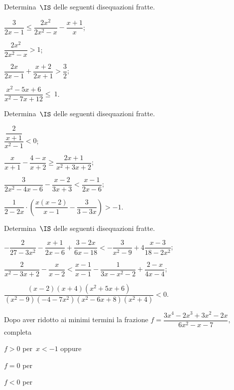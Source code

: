 \begin{esercizio}[\Ast]
\label{ese:21.62}
Determina~$\IS$ delle seguenti disequazioni fratte.
\begin{multicols}{2}
\begin{enumeratea}
\spazielenx
 \item $\dfrac{3}{2x-1}\le \dfrac{2x^{2}}{2x^{2}-x}-\dfrac{x+1}{x}$;
\item $\dfrac{2x^{2}}{2x^{2}-x}>1$;
\item $\dfrac{2x}{2x-1}+\dfrac{x+2}{2x+1}>\dfrac{3}{2}$;
\item $\dfrac{x^{2}-5x+6}{x^{2}-7x+12}\le~1$.
\end{enumeratea}
\end{multicols}
\end{esercizio}

\begin{esercizio}[\Ast]
\label{ese:21.63}
Determina~$\IS$ delle seguenti disequazioni fratte.
\begin{multicols}{2}
\begin{enumeratea}
\spazielenx
 \item $\dfrac{\dfrac{2}{x+1}}{x^{2}-1}<0$;
\item $\dfrac{x}{x+1}-\dfrac{4-x}{x+2}\ge \dfrac{2x+1}{x^{2}+3x+2}$;
\item $\dfrac{3}{2x^{2}-4x-6}-\dfrac{x-2}{3x+3}<\dfrac{x-1}{2x-6}$;
\item $\dfrac{1}{2-2x}\cdot \left(\dfrac{x(x-2)}{x-1}-\dfrac{3}{3-3x}\right)>-1$.
\end{enumeratea}
\end{multicols}
\end{esercizio}

\begin{esercizio}[\Ast]
\label{ese:21.64}
Determina~$\IS$ delle seguenti disequazioni fratte.

\begin{enumeratea}
 \item $-{\dfrac{2}{27-3x^{2}}}-\dfrac{x+1}{2x-6}+\dfrac{3-2x}{6x-18}<-{\dfrac{3}{x^{2}-9}}+4\dfrac{x-3}{18-2x^{2}}$;
\item $\dfrac{2}{x^{2}-3x+2}-\dfrac{x}{x-2}<\dfrac{x-1}{x-1}-\dfrac{1}{3x-x^{2}-2}+\dfrac{2-x}{4x-4}$;
\item $\dfrac{(x-2)(x+4)(x^{2}+5x+6)}{(x^{2}-9)(-4-7x^{2})(x^{2}-6x+8)(x^{2}+4)}<0$.
\end{enumeratea}
\end{esercizio}

\begin{esercizio}
\label{ese:21.65}
Dopo aver ridotto ai minimi termini la frazione
$f=\dfrac{3x^{4}-2x^{3}+3x^{2}-2x}{6x^{2}-x-7}$, completa

 \begin{enumeratea}
 \item $f>0$ per~$x<-1$ oppure \dotfill
 \item $f=0$ per \dotfill
 \item $f<0$ per \dotfill
 \end{enumeratea}
\end{esercizio}

